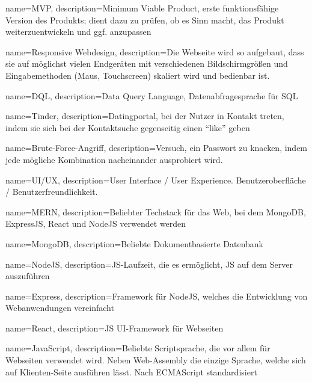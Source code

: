 

{
    name=MVP,
    description={Minimum Viable Product, erste funktionsfähige Version des Produkts; dient dazu zu prüfen, ob es Sinn macht, das Produkt weiterzuentwickeln und ggf. anzupassen}
}


{
    name=Responsive Webdesign,
    description={Die Webseite wird so aufgebaut, dass sie auf möglichst vielen Endgeräten mit verschiedenen Bildschirmgrößen und Eingabemethoden (Maus, Touchscreen) skaliert wird und bedienbar ist.}
}

{
    name=DQL,
    description={Data Query Language, Datenabfragesprache für SQL}
}

{
    name=Tinder,
    description={Datingportal, bei der Nutzer in Kontakt treten, indem sie sich bei der Kontaktsuche gegenseitig einen \enquote{like} geben}
}

{
    name=Brute-Force-Angriff,
    description={Versuch, ein Passwort zu knacken, indem jede mögliche Kombination nacheinander ausprobiert wird.}
}

{
    name=UI/UX,
    description={User Interface / User Experience. Benutzeroberfläche / Benutzerfreundlichkeit.} 
}

{
    name=MERN,
    description={Beliebter Techstack für das Web, bei dem MongoDB, ExpressJS, React und NodeJS verwendet werden}
}

{
    name=MongoDB,
    description={Beliebte Dokumentbasierte Datenbank}
}

{
    name=NodeJS,
    description={JS-Laufzeit, die es ermöglicht, JS auf dem Server auszuführen}
}

{
    name=Express,
    description={Framework für NodeJS, welches die Entwicklung von Webanwendungen vereinfacht}
}

{
    name=React,
    description={JS UI-Framework für Webseiten}
}

{
    name=JavaScript,
    description={Beliebte Scriptsprache, die vor allem für Webseiten verwendet wird. Neben Web-Assembly die einzige Sprache, welche sich auf Klienten-Seite ausführen lässt. Nach ECMAScript standardisiert}
}

